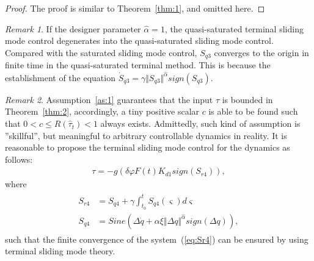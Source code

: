 \documentclass[Journal,letterpaper]{ascelike-new}
\theoremstyle{plain}
\theoremstyle{remark}
\newtheorem{myrem}{Remark}
\begin{document}
\begin{proof}
The proof is similar to Theorem~\ref{thm:1}, and omitted here.
\end{proof}
\begin{myrem}
If the designer parameter $\hat\alpha = 1$, the quasi-saturated terminal sliding mode control degenerates into the quasi-saturated sliding mode control. Compared with the saturated sliding mode control, $S_{q3}$ converges to the origin in finite time in the quasi-saturated terminal method. This is because the establishment of the equation $\dot S_{q3} = \gamma\Vert S_{q3}\Vert^{\hat\alpha}  sign(S_{q3})$.
\end{myrem}
\begin{myrem}
Assumption~\ref{as:1} guarantees that the input $\tau$ is bounded in Theorem~\ref{thm:2}, accordingly, a tiny positive scalar $c$ is able to be found such that $0<c\le R(\hat\tau_t)<1$ always exists. Admittedly, such kind of assumption is ''skillful'', but meaningful to arbitrary controllable dynamics in reality. It is reasonable to propose the terminal sliding mode control for the dynamics as follows:
\begin{align}
\tau = -g(\delta\varphi F(t) K_{d1}sign(S_{r4})),
\end{align}
where
\begin{align}
\begin{split}
S_{r4} &= S_{q4}+\gamma\int^t_{t_0}S_{q4}(\varsigma) d\varsigma\\
S_{q4} &= Sine(\Delta \dot q+\alpha\xi\Vert\Delta q\Vert^{\hat\alpha}sign(\Delta q)),\label{eq:Sr4}
\end{split}
\end{align}
such that the finite convergence of the system~(\ref{eq:Sr4}) can be ensured by using terminal sliding mode theory.
\end{myrem}
\end{document}
